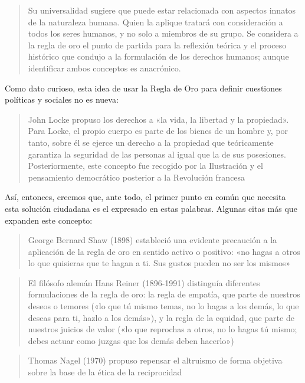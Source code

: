 \documentclass[
]{book}
\begin{document}
\begin{quote}
Su universalidad sugiere que puede estar relacionada con aspectos innatos de la naturaleza humana. Quien la aplique tratará con consideración a todos los seres humanos, y no solo a miembros de su grupo. Se considera a la regla de oro el punto de partida para la reflexión teórica y el proceso histórico que condujo a la formulación de los derechos humanos; aunque identificar ambos conceptos es anacrónico.
\end{quote}

Como dato curioso, esta idea de usar la Regla de Oro para definir cuestiones políticas y sociales no es nueva:

\begin{quote}
John Locke propuso los derechos a «la vida, la libertad y la propiedad». Para Locke, el propio cuerpo es parte de los bienes de un hombre y, por tanto, sobre él se ejerce un derecho a la propiedad que teóricamente garantiza la seguridad de las personas al igual que la de sus posesiones. Posteriormente, este concepto fue recogido por la Ilustración y el pensamiento democrático posterior a la Revolución francesa
\end{quote}

Así, entonces, creemos que, ante todo, el primer punto en común que necesita esta solución ciudadana es el expresado en estas palabras. Algunas citas más que expanden este concepto:

\begin{quote}
George Bernard Shaw (1898) estableció una evidente precaución a la aplicación de la regla de oro en sentido activo o positivo: «no hagas a otros lo que quisieras que te hagan a ti. Sus gustos pueden no ser los mismos»
\end{quote}

\begin{quote}
El filósofo alemán Hans Reiner (1896-1991) distinguía diferentes formulaciones de la regla de oro: la regla de empatía, que parte de nuestros deseos o temores («lo que tú mismo temas, no lo hagas a los demás, lo que deseas para ti, hazlo a los demás»), y la regla de la equidad, que parte de nuestros juicios de valor («lo que reprochas a otros, no lo hagas tú mismo; debes actuar como juzgas que los demás deben hacerlo»)
\end{quote}

\begin{quote}
Thomas Nagel (1970) propuso repensar el altruismo de forma objetiva sobre la base de la ética de la reciprocidad
\end{quote}
\end{document}
